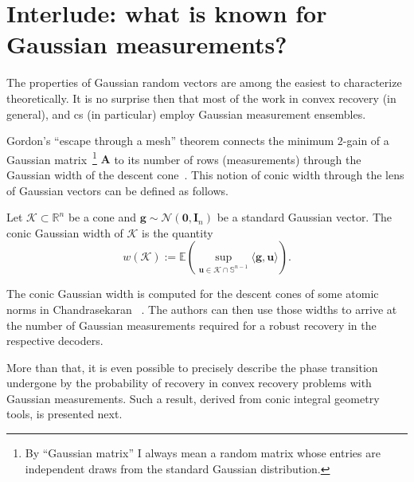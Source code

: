 \section{Interlude: what is known for Gaussian measurements?}

The properties of Gaussian random vectors are among the easiest to characterize theoretically. It is no surprise then that most of the work in convex recovery \cite{chandrasekaran2012, tropp2015a, vershynin2015a, plan2016, liaw2017, plan2017, vershynin2017} (in general), and \acrlong{cs} \cite{foucart2013, foygel2014, dirksen2018, dirksen2018a} (in particular) employ Gaussian measurement ensembles.

Gordon's ``escape through a mesh'' theorem \cite[Cor. 1.2]{gordon1988} connects the minimum $2$-gain of a Gaussian matrix~\footnote{By ``Gaussian matrix'' I always mean a random matrix whose entries are independent draws from the standard Gaussian distribution.} $\mathbf{A}$ to its number of rows (measurements) through the Gaussian width of the descent cone~\cite[Cor. 3.3]{chandrasekaran2012}. This notion of conic width through the lens of Gaussian vectors can be defined as follows.

\begin{definition}
    Let $\mathcal{K} \subset \mathbb{R}^{n}$ be a cone and $\mathbf{g} \sim \mathcal{N}(\mathbf{0}, \mathbf{I}_n)$ be a standard Gaussian vector. The conic Gaussian width of $\mathcal{K}$ is the quantity
    \begin{equation}
        w(\mathcal{K}) := \mathbb{E} \left ( \underset{\mathbf{u} \in \mathcal{K} \cap \mathbb{S}^{n-1}}{\sup} \langle \mathbf{g}, \mathbf{u}\rangle \right ).
    \end{equation}
\end{definition}

The conic Gaussian width is computed for the descent cones of some atomic norms in Chandrasekaran \etal~\cite{chandrasekaran2012}. The authors can then use those widths to arrive at the number of Gaussian measurements required for a robust recovery in the respective decoders.

More than that, it is even possible to precisely describe the phase transition undergone by the probability of recovery in convex recovery problems with Gaussian measurements. Such a result, derived from conic integral geometry tools, is presented next.

